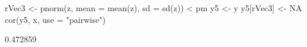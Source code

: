 \begin{Schunk}
\begin{Sinput}
 rVec3 <- pnorm(z, mean = mean(z), sd = sd(z)) < pm
 y5 <- y
 y5[rVec3] <- NA
 cor(y5, x, use = "pairwise")
\end{Sinput}
\begin{Soutput}
[1] 0.472859
\end{Soutput}
\end{Schunk}
